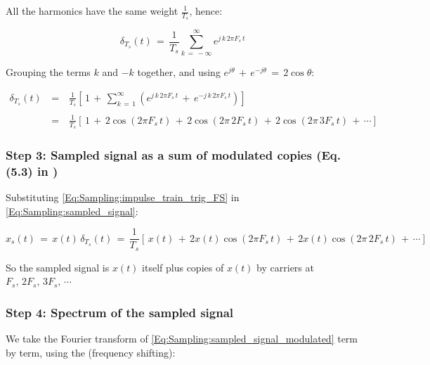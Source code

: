 \newpage
All the harmonics have the same weight $\displaystyle\frac{1}{T_s}$, hence:

\begin{equation}
\delta_{T_s}(t) \, = \, \frac{1}{T_s} \sum_{k \, = \, -\infty}^{\infty} e^{j \, k \, 2 \pi F_s \, t}
\label{Eq:Sampling:impulse_train_exp_FS}
\end{equation}

Grouping the terms $k$ and $-k$ together, and using $e^{j\theta} \, + \, e^{-j\theta} \, = \, 2 \cos \theta$:

\begin{equation}
\begin{array}{lll}
\delta_{T_s}(t) \, &=& \, \displaystyle\frac{1}{T_s} \left[ \, 1 \, + \, \sum_{k \, = \, 1}^{\infty} \left( e^{j \, k \, 2 \pi F_s \, t} \, + \, e^{-j \, k \, 2 \pi F_s \, t} \right) \right] \\ \\
&=& \, \displaystyle\frac{1}{T_s} \left[ \, 1 \, + \, 2 \cos (2 \pi F_s \, t) \, + \, 2 \cos (2 \pi \, 2 F_s \, t) \, + \, 2 \cos (2 \pi \, 3 F_s \, t) \, + \, \cdots \right]
\end{array}
\label{Eq:Sampling:impulse_train_trig_FS}
\end{equation}


\subsubsection*{Step 3: Sampled signal as a sum of modulated copies (Eq. (5.3) in \cite{signal_processing_Lathi})}

Substituting \autoref{Eq:Sampling:impulse_train_trig_FS} in \autoref{Eq:Sampling:sampled_signal}:

\begin{equation}
x_s(t) \, = \, x(t) \, \delta_{T_s}(t) \, = \, \frac{1}{T_s} \left[ \, x(t) \, + \, 2 x(t) \cos (2 \pi F_s \, t) \, + \, 2 x(t) \cos (2 \pi \, 2 F_s \, t) \, + \, \cdots \right]
\label{Eq:Sampling:sampled_signal_modulated}
\end{equation}

So the sampled signal is $x(t)$ itself plus copies of $x(t)$  by carriers at $F_s, \, 2F_s, \, 3F_s, \, \cdots$

\subsubsection*{Step 4: Spectrum of the sampled signal}

We take the Fourier transform of \autoref{Eq:Sampling:sampled_signal_modulated} term by term, using the  (frequency shifting):


